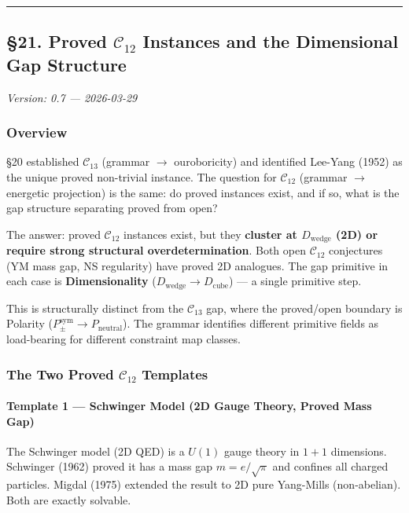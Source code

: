 \documentclass[12pt,a4paper]{article}
\newcommand{\pilcrow}{\S}
\begin{document}
\begin{center}
\rule{0.5\textwidth}{0.4pt}
\end{center}

\subsection{\pilcrow{}21. Proved $\mathcal{C}_{12}$ Instances and the Dimensional Gap Structure}

\emph{Version: 0.7 --- 2026-03-29}

\subsubsection{Overview}

\pilcrow{}20 established $\mathcal{C}_{13}$ (grammar $\rightarrow$ ouroboricity) and identified Lee-Yang (1952) as the unique proved non-trivial instance. The question for $\mathcal{C}_{12}$ (grammar $\rightarrow$ energetic projection) is the same: do proved instances exist, and if so, what is the gap structure separating proved from open?

The answer: proved $\mathcal{C}_{12}$ instances exist, but they \textbf{cluster at $D_\text{wedge}$ (2D) or require strong structural overdetermination}. Both open $\mathcal{C}_{12}$ conjectures (YM mass gap, NS regularity) have proved 2D analogues. The gap primitive in each case is \textbf{Dimensionality} ($D_\text{wedge} \to D_\text{cube}$) --- a single primitive step.

This is structurally distinct from the $\mathcal{C}_{13}$ gap, where the proved/open boundary is Polarity ($P_{\pm}^{\text{sym}} \to P_\text{neutral}$). The grammar identifies different primitive fields as load-bearing for different constraint map classes.

\subsubsection{The Two Proved $\mathcal{C}_{12}$ Templates}

\paragraph{Template 1 --- Schwinger Model (2D Gauge Theory, Proved Mass Gap)}

The Schwinger model (2D QED) is a $U(1)$ gauge theory in $1+1$ dimensions. Schwinger (1962) proved it has a mass gap $m = e/\sqrt{\pi}$ and confines all charged particles. Migdal (1975) extended the result to 2D pure Yang-Mills (non-abelian). Both are exactly solvable.
\end{document}
